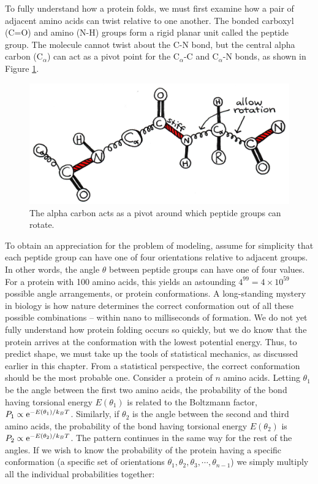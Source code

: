 To fully understand how a protein folds, we must first examine how a pair of adjacent amino acids can twist relative to one another.  The bonded carboxyl (C=O) and amino (N-H) groups form a rigid planar unit called the peptide group.  The molecule cannot twist about the C-N bond, but the central alpha carbon (C$_{\alpha}$) can act as a pivot point for the C$_{\alpha}$-C and C$_{\alpha}$-N bonds, as shown in Figure \ref{Fig8-6}.
\begin{figure}[htb]
 	\centering
 	\includegraphics[width=\textwidth]{./figures/Topic8/Fig8-6.jpg}
 	\caption{The alpha carbon acts as a pivot around which peptide groups can rotate.}
  	\label{Fig8-6}
\end{figure} 
To obtain an appreciation for the problem of modeling, assume for simplicity that each peptide group can have one of four orientations relative to adjacent groups.  In other words, the angle $\theta$ between peptide groups can have one of four values.  For a protein with 100 amino acids, this yields an astounding $4^{99} = 4\times10^{59}$ possible angle arrangements, or protein conformations.  A long-standing mystery in biology is how nature determines the correct conformation out of all these possible combinations -- within nano to milliseconds of formation.  We do not yet fully understand how protein folding occurs so quickly, but we do know that the protein arrives at the conformation with the lowest potential energy.  Thus, to predict shape, we must take up the tools of statistical mechanics, as discussed earlier in this chapter.  From a statistical perspective, the correct conformation should be the most probable one.  Consider a protein of $n$ amino acids.  Letting $\theta_1$ be the angle between the first two amino acids, the probability of the bond having torsional energy $E(\theta_1)$ is related to the Boltzmann factor, $P_1\propto{\rm e}^{-E\left(\theta_1\right)/k_BT}$.  Similarly, if $\theta_2$ is the angle between the second and third amino acids, the probability of the bond having torsional energy $E(\theta_2)$ is $P_2\propto{\rm e}^{-E\left(\theta_2\right)/k_BT}$.  The pattern continues in the same way for the rest of the angles.  If we wish to know the probability of the protein having a specific conformation (a specific set of orientations $\theta_1, \theta_2, \theta_3,\cdots, \theta_{n-1}$) we simply multiply all the individual probabilities together:
